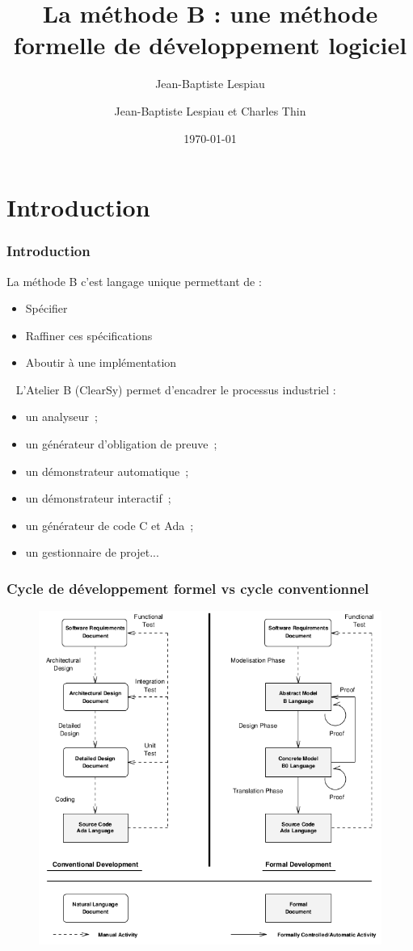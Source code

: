 \documentclass[11pt,a4paper,xcolor=table]{beamer} %
\author[]{Jean-Baptiste Lespiau}
\author{Jean-Baptiste Lespiau et Charles Thin}
\title{La méthode B : une méthode formelle de développement logiciel}
\date\today
\begin{document}
\frame{\titlepage}

\section*{Introduction}

\begin{frame}
\frametitle{Introduction}
La méthode B c'est langage unique permettant de :
\begin{itemize}
\item Spécifier
\item Raffiner ces spécifications
\item Aboutir à une implémentation
\end{itemize}

\pause
~\newline
L'Atelier B (ClearSy) permet d'encadrer le processus industriel :
\begin{itemize}
\item un analyseur~;
\item un générateur d'obligation de preuve~;
\item un démonstrateur automatique~;
\item un démonstrateur interactif~;
\item un générateur de code C et Ada~;
\item un gestionnaire de projet...
\end{itemize}
\end{frame}

\begin{frame}
\frametitle{Cycle de développement formel vs cycle conventionnel}
\begin{figure}[h]
\centering
\includegraphics[scale=0.33]{ressources/formal_dev.png}
\end{figure}
\end{frame}
\end{document}
